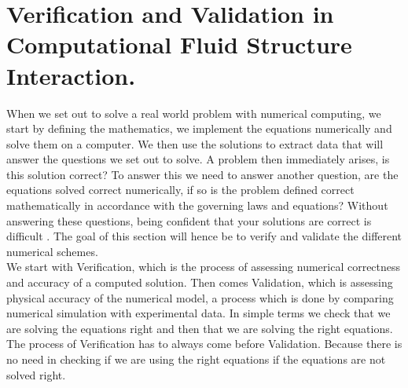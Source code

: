 \chapter{Verification and Validation in Computational Fluid Structure Interaction. }
When we set out to solve a real world problem with numerical computing, we start by defining the mathematics, we implement the equations numerically and solve them on a computer. We then use the solutions to extract data that will answer the questions we set out to solve. A problem then immediately arises, is this solution correct? To answer this we need to answer another question, are the equations solved correct numerically, if so is the problem defined correct mathematically in accordance with the governing laws and equations?
Without answering these questions, being confident that your solutions are correct is difficult \cite{Selin2014}. The goal of this section will hence be to verify and validate the different numerical schemes. \\
We start with Verification, which is the process of assessing numerical correctness and accuracy of a computed solution. Then comes Validation, which is assessing physical accuracy of the numerical model, a process which is done by comparing numerical simulation with experimental data. In simple terms we check that we are solving the equations right and then that we are solving the right equations. The process of Verification has to always come before Validation. Because there is no need in checking if we are using the right equations if the equations are not solved right. 

